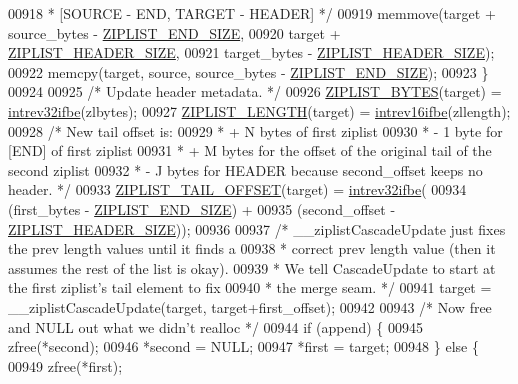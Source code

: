 \begin{DoxyCode}
{{00918 \textcolor{comment}{         *   [SOURCE - END, TARGET - HEADER] */}
00919         memmove(target + source\_bytes - \hyperlink{ziplist_8c_ab15031d20f1d4b1a8b6bc843752958ee}{ZIPLIST\_END\_SIZE},
00920                 target + \hyperlink{ziplist_8c_a3b8ef40d77ce00bcad424d0c07e2de95}{ZIPLIST\_HEADER\_SIZE},
00921                 target\_bytes - \hyperlink{ziplist_8c_a3b8ef40d77ce00bcad424d0c07e2de95}{ZIPLIST\_HEADER\_SIZE});
00922         memcpy(target, source, source\_bytes - \hyperlink{ziplist_8c_ab15031d20f1d4b1a8b6bc843752958ee}{ZIPLIST\_END\_SIZE});
00923     \}
00924 
00925     \textcolor{comment}{/* Update header metadata. */}
00926     \hyperlink{ziplist_8c_a28b9c7884758bc2d52f204903a4bb642}{ZIPLIST\_BYTES}(target) = \hyperlink{endianconv_8h_a4e85d9ae58a3b1e6ceaabfd4689002c7}{intrev32ifbe}(zlbytes);
00927     \hyperlink{ziplist_8c_a6d779e84aca736e354768fcf87393b98}{ZIPLIST\_LENGTH}(target) = \hyperlink{endianconv_8h_a47540b5867d4cb1e322e83eaf2b50b56}{intrev16ifbe}(zllength);
00928     \textcolor{comment}{/* New tail offset is:}
00929 \textcolor{comment}{     *   + N bytes of first ziplist}
00930 \textcolor{comment}{     *   - 1 byte for [END] of first ziplist}
00931 \textcolor{comment}{     *   + M bytes for the offset of the original tail of the second ziplist}
00932 \textcolor{comment}{     *   - J bytes for HEADER because second\_offset keeps no header. */}
00933     \hyperlink{ziplist_8c_adf2235d74c81861c85fb5d2ffa209397}{ZIPLIST\_TAIL\_OFFSET}(target) = \hyperlink{endianconv_8h_a4e85d9ae58a3b1e6ceaabfd4689002c7}{intrev32ifbe}(
00934                                    (first\_bytes - \hyperlink{ziplist_8c_ab15031d20f1d4b1a8b6bc843752958ee}{ZIPLIST\_END\_SIZE}) +
00935                                    (second\_offset - \hyperlink{ziplist_8c_a3b8ef40d77ce00bcad424d0c07e2de95}{ZIPLIST\_HEADER\_SIZE}));
00936 
00937     \textcolor{comment}{/* \_\_ziplistCascadeUpdate just fixes the prev length values until it finds a}
00938 \textcolor{comment}{     * correct prev length value (then it assumes the rest of the list is okay).}
00939 \textcolor{comment}{     * We tell CascadeUpdate to start at the first ziplist's tail element to fix}
00940 \textcolor{comment}{     * the merge seam. */}
00941     target = \_\_ziplistCascadeUpdate(target, target+first\_offset);
00942 
00943     \textcolor{comment}{/* Now free and NULL out what we didn't realloc */}
00944     \textcolor{keywordflow}{if} (append) \{
00945         zfree(*second);
00946         *second = NULL;
00947         *first = target;
00948     \} \textcolor{keywordflow}{else} \{
00949         zfree(*first);
}}
\end{DoxyCode}
